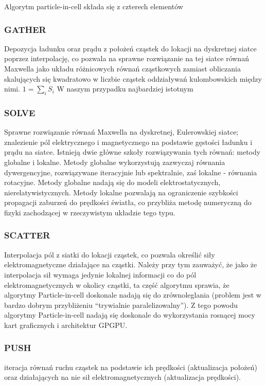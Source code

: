     Algorytm particle-in-cell składa się z czterech elementów 
    \subsubsection{GATHER}
    Depozycja ładunku oraz prądu z położeń cząstek do lokacji na dyskretnej siatce poprzez interpolację,
    co pozwala na sprawne rozwiązanie na tej siatce
    równań Maxwella jako układu różnicowych równań cząstkowych zamiast obliczania skalujących się kwadratowo w liczbie cząstek
    oddziaływań kulombowskich między nimi.
    $1 = \sum_i S_i$ 
    W naszym przypadku najbardziej istotnym 
    \subsubsection{SOLVE}
    Sprawne rozwiązanie równań Maxwella na dyskretnej, Eulerowskiej siatce;
    znalezienie pól elektrycznego i magnetycznego
    na podstawie gęstości ładunku i prądu na siatce.
    Istnieją dwie główne szkoły rozwiązywania tych równań: metody globalne i lokalne. Metody globalne wykorzystują
    zazwyczaj równania dywergencyjne, rozwiązywane iteracyjnie lub spektralnie,
    zaś lokalne - równania rotacyjne. Metody globalne nadają się do modeli elektrostatycznych, nierelatywistycznych.
    Metody lokalne pozwalają na ograniczenie szybkości propagacji zaburzeń do prędkości światła, co przybliża
    metodę numeryczną do fizyki zachodzącej w rzeczywistym układzie tego typu.
    \subsubsection{SCATTER}
    Interpolacja pól z siatki do lokacji cząstek, co pozwala określić siły elektromagnetyczne działające na cząstki.
    Należy przy tym zauważyć, że jako że interpolacja sił wymaga jedynie lokalnej informacji co do pól
    elektromagnetycznych w okolicy cząstki, ta część algorytmu sprawia, że algorytmy Particle-in-cell doskonale
    nadają się do zrównoleglania (problem jest w bardzo dobrym przybliżeniu ``trywialnie paralelizowalny''). Z tego powodu algorytmy
    Particle-in-cell nadają się doskonale do wykorzystania rosnącej mocy kart graficznych i architektur GPGPU.
    \subsubsection{PUSH}
    iteracja równań ruchu cząstek na podstawie ich prędkości (aktualizacja położeń)
    oraz działających na nie sił elektromagnetycznych (aktualizacja prędkości).

